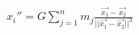 
$ x_{i}''  = G \sum\limits_{j=1}^{n} m_ {j} \frac 
{\overrightarrow{x_{1}} - \overrightarrow{x_{2}}}
{||\overrightarrow{x_{1}} - \overrightarrow{x_{2}}|| ^{3}} $ 